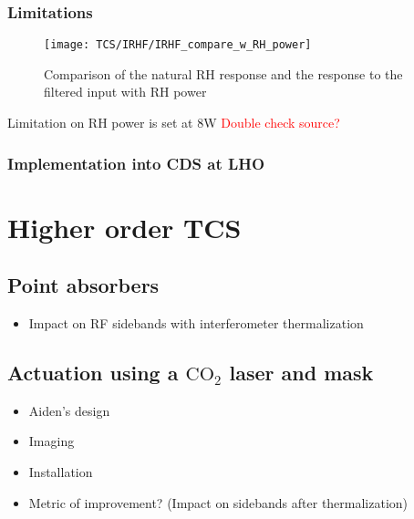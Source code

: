 \subsubsection{Limitations}
\begin{figure}[H]
\texttt{[image: TCS/IRHF/IRHF\_compare\_w\_RH\_power]}
\caption{Comparison of the natural RH response and the response to the filtered input with RH power}
\label{fig:RH_power}
\end{figure}
Limitation on RH power is set at 8W \textcolor{red}{Double check source?}

\subsubsection{Implementation into CDS at LHO}



\section{Higher order TCS}

\subsection{Point absorbers}


\begin{itemize}
\item Impact on RF sidebands with interferometer thermalization
\end{itemize}

\subsection{Actuation using a $\mathrm{CO_2}$ laser and mask}
\begin{itemize}
\item Aiden's design
\item Imaging 
\item Installation

\item Metric of improvement? (Impact on sidebands after thermalization)
\end{itemize}
